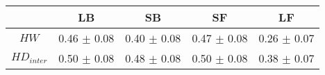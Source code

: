 \begin{tabular}{c c c c c }
\hline
 & LB & SB & SF & LF \\
\hline
$HW$ & 0.46 $\pm$ 0.08 & 0.40 $\pm$ 0.08 & 0.47 $\pm$ 0.08 & 0.26 $\pm$ 0.07 \\
$HD_{inter}$ & 0.50 $\pm$ 0.08 & 0.48 $\pm$ 0.08 & 0.50 $\pm$ 0.08 & 0.38 $\pm$ 0.07 \\
\hline
\end{tabular}